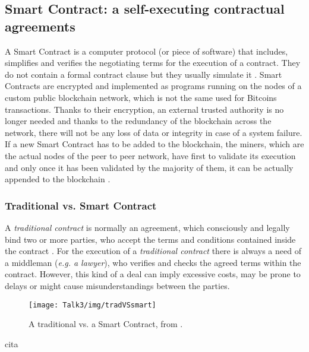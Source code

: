 \subsection{Smart Contract: a self-executing contractual agreements}
A Smart Contract is a computer protocol (or piece of software) that includes, simplifies and verifies the negotiating terms for the execution of a contract. They do not contain a formal contract clause but they usually simulate it \cite{SC1}.
Smart Contracts are encrypted and implemented as programs running on the nodes of a custom public blockchain network, which is not the same used for Bitcoins transactions. Thanks to their encryption, an external trusted authority is no longer needed and thanks to the redundancy of the blockchain across the network, there will not be any loss of data or integrity in case of a system failure.
If a new Smart Contract has to be added to the blockchain, the miners, which are the actual nodes of the peer to peer network, have first to validate its execution and only once it has been validated by the majority of them, it can be actually appended to the blockchain \cite{SC2}.


\subsubsection{Traditional vs. Smart Contract}
A \textit{traditional contract} is normally an agreement, which consciously and legally bind two or more parties, who accept the terms and conditions contained inside the contract \cite{SC12,SC13}. For the execution of a \textit{traditional contract} there is always a need of a middleman (\textit{e.g. a lawyer}), who verifies and checks the agreed terms within the contract. However, this kind of a deal can imply excessive costs, may be prone to delays or might cause misunderstandings between the parties. 

           \begin{figure}[H]
         \begin{center}
         \texttt{[image: Talk3/img/tradVSsmart]}
         \end{center}
         \caption{A traditional vs. a Smart Contract, from \cite{SC2}.}
         \label{label}
       \end{figure}
cita\cite{SC2}






